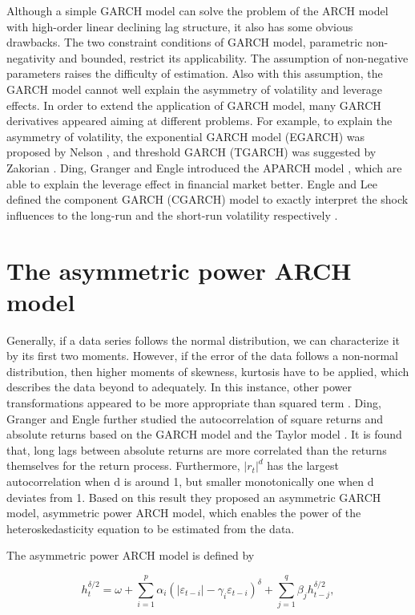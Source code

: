Although a simple GARCH model can solve the problem of the ARCH model with high-order linear declining lag structure, it also has some obvious drawbacks.  The two constraint conditions of GARCH model, parametric non-negativity and bounded, restrict its applicability. The assumption of non-negative parameters raises the difficulty of estimation. Also with this assumption, the GARCH model cannot well explain the asymmetry of volatility and leverage effects. In order to extend the application of GARCH model, many GARCH derivatives appeared aiming at different problems. For example, to explain the asymmetry of volatility, the exponential GARCH model (EGARCH) was proposed by Nelson \citep{Nelson1991}, and threshold GARCH (TGARCH) was suggested by Zakorian \citep{Zakoian1994}. Ding, Granger and Engle introduced the APARCH model \citep{Ding1993}, which are able to explain the leverage effect in financial market better. Engle and Lee defined the component GARCH (CGARCH) model to exactly interpret the shock influences to the long-run and the short-run volatility respectively \citep{0-19-829683-5}.

\section{The asymmetric power ARCH model}

Generally, if a data series follows the normal distribution, we can characterize it by its first two moments. However, if the error of the data follows a non-normal distribution, then higher moments of skewness, kurtosis have to be applied, which describes the data beyond to adequately. In this instance, other power transformations appeared to be more appropriate than squared term \citep{McKenzie1999}. Ding, Granger and Engle further studied the autocorrelation of square returns and absolute returns based on the GARCH model and the Taylor model \citep{Ding1993}. It is found that, long lags between absolute returns are more correlated than the returns themselves for the return process. Furthermore, $|r_{t}|^{d}$ has the largest autocorrelation when d is around 1, but smaller monotonically one when d deviates from 1. Based on this result they proposed an asymmetric GARCH model, asymmetric power ARCH model, which enables the power of the heteroskedasticity equation to be estimated from the data.


The asymmetric power ARCH model is defined by

\begin{equation}
h_{t}^{\delta/2} = \omega + \sum_{i=1}^{p} \alpha_{i}(|\varepsilon_{t-i}|-\gamma_{i}\varepsilon_{t-i})^{\delta} + \sum_{j=1}^{q}\beta_{j}h_{t-j}^{\delta/2},
\end{equation}

